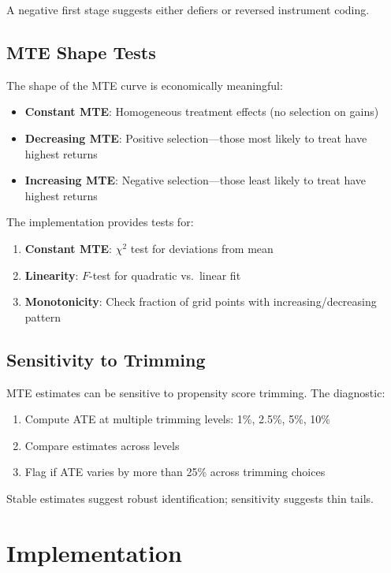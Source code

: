 A negative first stage suggests either defiers or reversed instrument coding.

\subsection{MTE Shape Tests}

The shape of the MTE curve is economically meaningful:

\begin{itemize}
\item \textbf{Constant MTE}: Homogeneous treatment effects (no selection on gains)
\item \textbf{Decreasing MTE}: Positive selection---those most likely to treat have highest returns
\item \textbf{Increasing MTE}: Negative selection---those least likely to treat have highest returns
\end{itemize}

The implementation provides tests for:
\begin{enumerate}
\item \textbf{Constant MTE}: $\chi^2$ test for deviations from mean
\item \textbf{Linearity}: $F$-test for quadratic vs.\ linear fit
\item \textbf{Monotonicity}: Check fraction of grid points with increasing/decreasing pattern
\end{enumerate}

\subsection{Sensitivity to Trimming}

MTE estimates can be sensitive to propensity score trimming. The diagnostic:

\begin{enumerate}
\item Compute ATE at multiple trimming levels: 1\%, 2.5\%, 5\%, 10\%
\item Compare estimates across levels
\item Flag if ATE varies by more than 25\% across trimming choices
\end{enumerate}

Stable estimates suggest robust identification; sensitivity suggests thin tails.

\section{Implementation}
\label{sec:mte-implementation}

